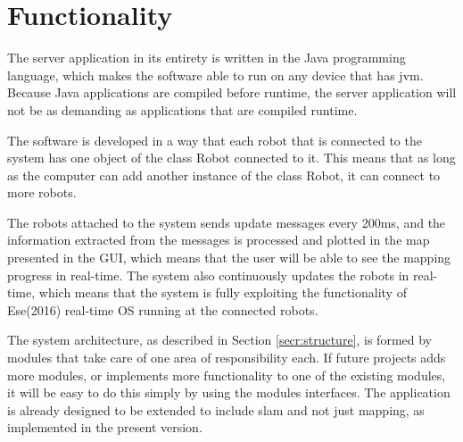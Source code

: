 \newpage
\section{Functionality}
\label{secr:functionality}
The server application in its entirety is written in the Java programming language, which makes the software able to run on any device that has \acrlong{jvm}. Because Java applications are compiled before runtime, the server application will not be as demanding as applications that are compiled runtime.

The software is developed in a way that each robot that is connected to the system has one object of the class Robot connected to it. This means that as long as the computer can add another instance of the class Robot, it can connect to more robots.

The robots attached to the system sends update messages every 200ms, and the information extracted from the messages is processed and plotted in the map presented in the GUI, which means that the user will be able to see the mapping progress in real-time. The system also continuously updates the robots in real-time, which means that the system is fully exploiting the functionality of Ese(2016) real-time OS running at the connected robots.

The system architecture, as described in Section \ref{secr:structure}, is formed by modules that take care of one area of responsibility each. If future projects adds more modules, or implements more functionality to one of the existing modules, it will be easy to do this simply by using the modules interfaces. The application is already designed to be extended to include \acrfull{slam} and not just mapping, as implemented in the present version.